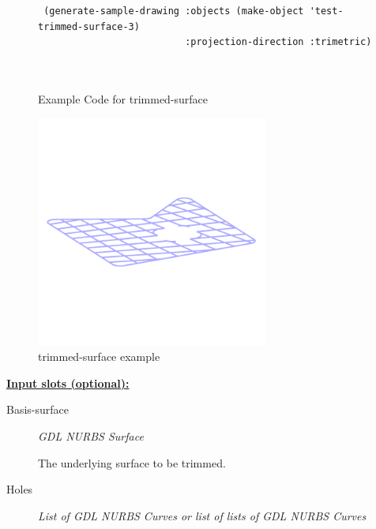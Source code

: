 \documentclass [11pt]{book}
\begin{document}
\begin{itemize}
\begin{figure}
\begin{lrbox}{\boxedverb}
\begin{minipage}{\linewidth}
{\begin{verbatim}
 (generate-sample-drawing :objects (make-object 'test-trimmed-surface-3)
                          :projection-direction :trimetric)



\end{verbatim}}
\end{minipage}
\end{lrbox}
\fbox{\usebox{\boxedverb}}

\caption{Example Code for trimmed-surface}

\label{fig:example-code-trimmed-surface}

\end{figure}

\begin{figure}
\begin{center}
\includegraphics[width=3in,height=3in]{../images/example-trimmed-surface.pdf}
\end{center}

\caption{trimmed-surface example}

\label{fig:trimmed-surface}

\end{figure}





\textbf{
\underline{Input slots (optional):}}

\begin{description}

\item [Basis-surface]
\emph{GDL NURBS Surface}

 The underlying surface to be trimmed.




\item [Holes]
\emph{List of GDL NURBS Curves or list of lists of GDL NURBS Curves}


\end{description}
\end{itemize}
\end{document}
